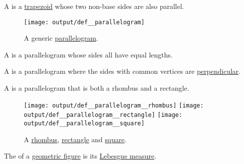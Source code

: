\begin{definition}\label{def:parallelogram}
  A  is a \hyperref[def:trapezoid]{trapezoid} whose two non-base sides are also parallel.

  \begin{figure}[!ht]
    \centering
    \texttt{[image: output/def\_\_parallelogram]}
    \caption{A generic \hyperref[def:parallelogram]{parallelogram}.}\label{fig:def:parallelogram}
  \end{figure}

  \begin{thmenum}
     A  is a parallelogram whose sides all have equal lengths.

     A  is a parallelogram where the sides with common vertices are \hyperref[def:perpendicularity]{perpendicular}.

     A  is a parallelogram that is both a rhombus and a rectangle.

    \begin{figure}[!ht]
      \hfill
      \texttt{[image: output/def\_\_parallelogram\_\_rhombus]}
      \hfill
      \hfill
      \texttt{[image: output/def\_\_parallelogram\_\_rectangle]}
      \hfill
      \hfill
      \texttt{[image: output/def\_\_parallelogram\_\_square]}
      \hfill
      \hfill
      \caption{A \hyperref[def:parallelogram/rhombus]{rhombus}, \hyperref[def:parallelogram/rectangle]{rectangle} and \hyperref[def:parallelogram/square]{square}.}\label{fig:def:parallelogram/rhombus}
    \end{figure}
  \end{thmenum}
\end{definition}

\begin{proposition}\label{thm:volume_of_cube}
\end{proposition}

\begin{definition}\label{def:figure_area}\mimprovised
  The  of a \hyperref[con:geometric_shape]{geometric figure} is its \hyperref[def:lebesgue_measure]{Lebesgue measure}.
\end{definition}

